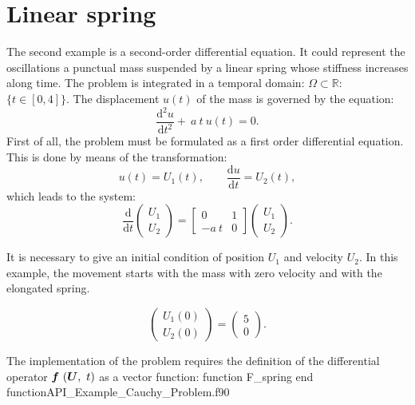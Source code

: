  \section{Linear spring}
 The second example is a second-order differential equation. It could represent the oscillations a punctual mass suspended by a linear spring whose stiffness increases along time. The problem is integrated in a temporal domain: $\Omega \subset \mathbb{R} : $ $\{t\in  [0,4]\}.$ The displacement $u(t)$ of the mass  is governed by the equation:
\begin{equation*}
    \frac{\mbox{d}^2 u}{\mbox{d} t^2} + \ a \ t \ u(t) = 0.
\end{equation*}
 First of all, the problem must be formulated as a first order differential equation. 
 This is done by means of the transformation:
 \begin{equation*}
    u(t) = U_1 (t), \qquad \frac{\mbox{d} u}{\mbox{d} t} = U_2(t),
 \end{equation*}
 which leads to the system: 
 \begin{equation*}
 \frac{\text{d}}{\text{d}t}\begin{pmatrix}
 U_{1}\\
 U_{2}
 \end{pmatrix}
 =
 \begin{bmatrix}
 0 & 1 \\
 -a \ t & 0
 \end{bmatrix}
 \begin{pmatrix}
 U_{1} \\
 U_{2}
 \end{pmatrix}.
 \end{equation*}
 
 It is necessary to give an initial condition of position $ U_1 $  and velocity $ U_2$. In this example, the movement starts with the mass with zero velocity and with the elongated spring.
 
 \begin{equation*}
 \begin{pmatrix}
 U_{1}(0)\\
 U_{2}(0)
 \end{pmatrix}
 =
 \begin{pmatrix}
 5 \\
 0
 \end{pmatrix}.
 \end{equation*}
 
 
 The implementation of the problem requires the definition of the differential operator  $ \vect{f}\ (\vect{U},\ t) $ as a vector function:
 \vspace{0.5cm} 
 {function F_spring}
 {end function}{API_Example_Cauchy_Problem.f90}

